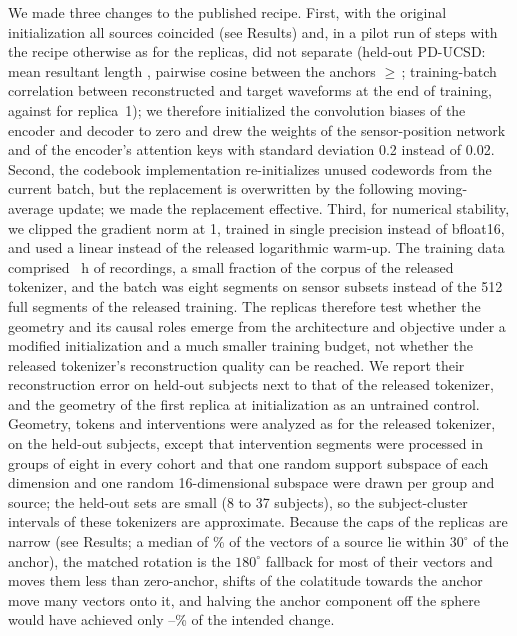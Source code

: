 \documentclass[10pt,letterpaper]{article}
\begin{document}
We made three changes to the published recipe. First, with the original
initialization all sources coincided (see Results) and, in a pilot run of
\ReplicaSteps{} steps with the recipe otherwise as for the replicas, did not separate
(held-out PD-UCSD: mean resultant length \PilotRbar, pairwise cosine between the anchors
$\geq$\,\PilotOffdiagMin; training-batch correlation between reconstructed and target waveforms
\PilotPCC{} at the end of training, against \RepPCC{} for replica~1); we therefore initialized the convolution biases of the encoder and decoder to zero
and drew the weights of the sensor-position network and of the encoder's attention keys with
standard deviation 0.2 instead of 0.02. Second, the codebook implementation re-initializes unused
codewords from the current batch, but the replacement is overwritten by the following
moving-average update; we made the replacement effective. Third, for numerical stability, we clipped the gradient norm at 1,
trained in single precision instead of bfloat16, and used a linear instead of the released
logarithmic warm-up. The training data comprised \ReplicaHours{}~h of recordings, a small fraction
of the corpus of the released tokenizer, and the batch was eight segments on sensor subsets instead
of the 512 full segments of the released training. The replicas therefore test whether the geometry
and its causal roles emerge from the architecture and objective under a modified initialization
and a much smaller training budget, not whether the released tokenizer's reconstruction quality can
be reached. We report their reconstruction error on held-out subjects next to that of the released
tokenizer, and the geometry of the first replica at initialization as an untrained control.
Geometry, tokens and interventions were analyzed as for the released tokenizer, on the held-out
subjects, except that intervention segments were processed in groups of eight in every cohort and
that one random support subspace of each dimension and one random 16-dimensional subspace were
drawn per group and source; the held-out sets are small (8 to 37 subjects), so the subject-cluster
intervals of these tokenizers are approximate. Because the caps of the replicas are narrow
(see Results; a median of \RepWithinThirtyMedianPct\% of the vectors of a source lie
within $30^\circ$ of the anchor), the matched rotation is the $180^\circ$ fallback for most of their
vectors and moves them less than zero-anchor, shifts of the colatitude towards the anchor move many
vectors onto it, and halving the anchor component off the sphere would have achieved only
\RepOffSphereHalfMin--\RepOffSphereHalfMax\% of the intended change.
\end{document}
